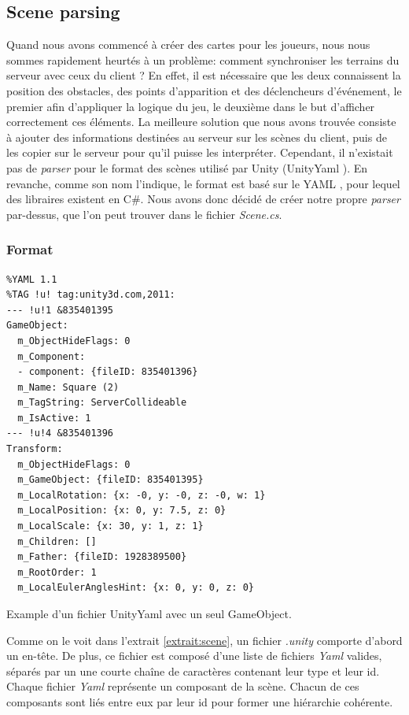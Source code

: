\documentclass[a4paper]{article}
\begin{document}
\subsection{Scene parsing}
Quand nous avons commencé à créer des cartes pour les joueurs, nous nous sommes rapidement heurtés à un problème: comment synchroniser les terrains du serveur avec ceux du client ? En effet, il est nécessaire que les deux connaissent la position des obstacles, des points d'apparition et des déclencheurs d'événement, le premier afin d'appliquer la logique du jeu, le deuxième dans le but d'afficher correctement ces éléments. La meilleure solution que nous avons trouvée consiste à ajouter des informations destinées au serveur sur les scènes du client, puis de les copier sur le serveur pour qu'il puisse les interpréter. Cependant, il n'existait pas de \textit{parser} \cite{parser} pour le format des scènes utilisé par Unity (UnityYaml \cite{unityyaml}). En revanche, comme son nom l'indique, le format est basé sur le YAML \cite{yaml}, pour lequel des libraires existent en C\#. Nous avons donc décidé de créer notre propre \textit{parser} par-dessus, que l'on peut trouver dans le fichier \emph{Scene.cs}.

\subsubsection{Format}
\begin{listing}[!h]
\begin{verbatim}
%YAML 1.1
%TAG !u! tag:unity3d.com,2011:
--- !u!1 &835401395
GameObject:
  m_ObjectHideFlags: 0
  m_Component:
  - component: {fileID: 835401396}
  m_Name: Square (2)
  m_TagString: ServerCollideable
  m_IsActive: 1
--- !u!4 &835401396
Transform:
  m_ObjectHideFlags: 0
  m_GameObject: {fileID: 835401395}
  m_LocalRotation: {x: -0, y: -0, z: -0, w: 1}
  m_LocalPosition: {x: 0, y: 7.5, z: 0}
  m_LocalScale: {x: 30, y: 1, z: 1}
  m_Children: []
  m_Father: {fileID: 1928389500}
  m_RootOrder: 1
  m_LocalEulerAnglesHint: {x: 0, y: 0, z: 0}
\end{verbatim}
\caption{Example d'un fichier UnityYaml avec un seul GameObject.}
\label{extrait:scene}
\end{listing}
\noindent Comme on le voit dans l'extrait \ref{extrait:scene}, un fichier \textit{.unity} comporte d'abord un en-tête. De plus, ce fichier est composé d'une liste de fichiers \textit{Yaml} valides, séparés par un une courte chaîne de caractères contenant leur type et leur id. Chaque fichier \textit{Yaml} représente un composant de la scène. Chacun de ces composants sont liés entre eux par leur id pour former une hiérarchie cohérente. 
\end{document}
